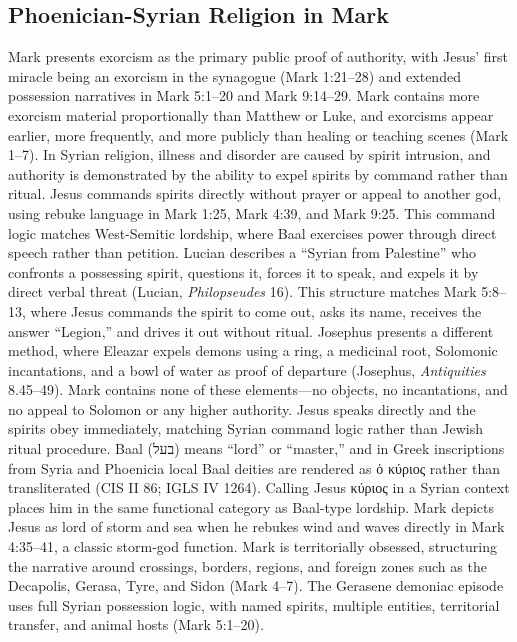 \subsection{Phoenician-Syrian Religion in Mark}

Mark presents exorcism as the primary public proof of authority, with Jesus' first miracle being an exorcism in the synagogue (Mark 1:21--28) and extended possession narratives in Mark 5:1--20 and Mark 9:14--29.
Mark contains more exorcism material proportionally than Matthew or Luke, and exorcisms appear earlier, more frequently, and more publicly than healing or teaching scenes (Mark 1--7).
In Syrian religion, illness and disorder are caused by spirit intrusion, and authority is demonstrated by the ability to expel spirits by command rather than ritual.
Jesus commands spirits directly without prayer or appeal to another god, using rebuke language in Mark 1:25, Mark 4:39, and Mark 9:25.
This command logic matches West-Semitic lordship, where Baal exercises power through direct speech rather than petition.
Lucian describes a ``Syrian from Palestine'' who confronts a possessing spirit, questions it, forces it to speak, and expels it by direct verbal threat (Lucian, \emph{Philopseudes} 16).
This structure matches Mark 5:8--13, where Jesus commands the spirit to come out, asks its name, receives the answer ``Legion,'' and drives it out without ritual.
Josephus presents a different method, where Eleazar expels demons using a ring, a medicinal root, Solomonic incantations, and a bowl of water as proof of departure (Josephus, \emph{Antiquities} 8.45--49).
Mark contains none of these elements---no objects, no incantations, and no appeal to Solomon or any higher authority.
Jesus speaks directly and the spirits obey immediately, matching Syrian command logic rather than Jewish ritual procedure.
Baal (בעל) means ``lord'' or ``master,'' and in Greek inscriptions from Syria and Phoenicia local Baal deities are rendered as ὁ κύριος rather than transliterated (CIS II 86; IGLS IV 1264).
Calling Jesus κύριος in a Syrian context places him in the same functional category as Baal-type lordship.
Mark depicts Jesus as lord of storm and sea when he rebukes wind and waves directly in Mark 4:35--41, a classic storm-god function.
Mark is territorially obsessed, structuring the narrative around crossings, borders, regions, and foreign zones such as the Decapolis, Gerasa, Tyre, and Sidon (Mark 4--7).
The Gerasene demoniac episode uses full Syrian possession logic, with named spirits, multiple entities, territorial transfer, and animal hosts (Mark 5:1--20).
